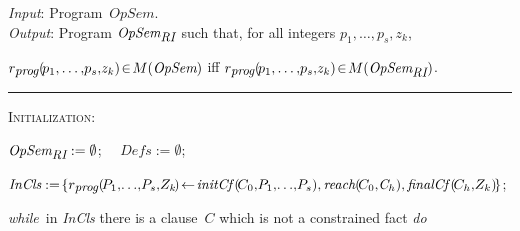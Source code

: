 \documentclass[english]{tlp}
\begin{document}
\noindent\hrulefill
	
	\noindent \emph{Input\/}: Program~$\textit{OpSem}$.\\ 
	\noindent \emph{Output\/}: Program $\textit{OpSem}_{\textit{\small{RI}}}$ such that,
for all integers $p_1,\ldots,\!p_s,\!z_k$,
	 
	$r_{\textit{\small prog}}(\!p_1,\ldots,\!p_s,\!z_k)\!\in\! M(\textit{OpSem})$ iff 
$r_{\textit{\small prog}}(\!p_1,\ldots,\!p_s,\!z_k)\!\in\! M(\textit{OpSem}_{\textit{\small{RI}}})$.\\	
\noindent\rule{30mm}{0.1mm}
	
	\noindent \textsc{Initialization}:

\noindent\hspace{.6mm}
$\textit{OpSem}_{\textit{\small{RI}}}:=\emptyset$; ~~$\textit{Defs}:= \emptyset$;

\noindent\hspace{.6mm}
$\textit{InCls}:=\!\{ 
r_{\textit{\small prog}}(\!P_1,\!\ldots\!,\!P_s,\!Z_k\!) 
\!\leftarrow\! \textit{initCf\/}
(\!C_0,\!P_1,\!\ldots\!,\!P_s), \textit{reach}(\!C_0,\!\textit{C}_h), \textit{finalCf\/}(\!C_h,\!Z_k)\!\}$;
	


	\noindent \textit{while}~in \textit{InCls} there is a clause~$C$
	which is not a constrained fact
	\textit{do}
	
	\smallskip
	
\end{document}
